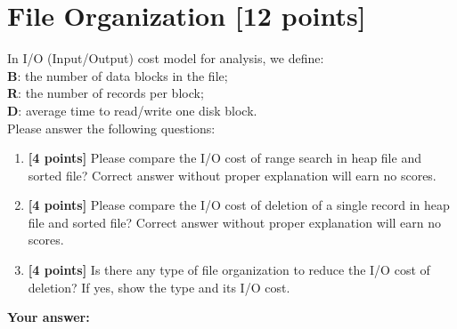 \documentclass[10pt]{article}
\begin{document}
\newpage
\section{File Organization \textbf{[12 points]}}
In I/O (Input/Output) cost model for analysis, we define: \\
\textbf{B}: the number of data blocks in the file;\\
\textbf{R}: the number of records per block;\\
\textbf{D}: average time to read/write one disk block.\\
Please answer the following questions:
\begin{enumerate}
	\item \textbf{[4 points]}
	      Please compare the I/O cost of range search in heap file and sorted file? Correct answer without proper explanation will earn no scores.  \\
	\item \textbf{[4 points]}
	      Please compare the I/O cost of deletion of a single record in heap file and sorted file? Correct answer without proper explanation will earn no scores.  \\
	\item \textbf{[4 points]}
	      Is there any type of file organization to reduce the I/O cost of deletion? If yes, show the type and its I/O cost.
\end{enumerate}
\textbf{Your answer:}



\newpage
\end{document}

